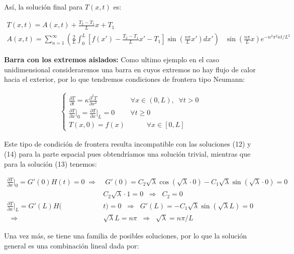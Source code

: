 \documentclass[12pt]{article}
\begin{document}
Así, la solución final para $T(x,t)$ es:

\begin{align}
    T(x,t) = A(x,t) + \frac{T_2-T_1}{L}x + T_1 \;\;\;\;\;\;\;& \\
    \nonumber A(x,t) = \sum_{n=1}^{\infty} \left(\frac{2}{L}\int_0^L \left[f(x')-\frac{T_2-T_1}{L}x' -T_1\right]\sin \left(\frac{n\pi}{L}x'\right)dx'\right)&\sin\left(\frac{n\pi}{L}x\right) e^{-n^2\pi^2\kappa t/L^2}
\end{align}

\textbf{Barra con los extremos aislados: }Como ultimo ejemplo en el caso unidimensional consideraremos una barra en cuyos extremos no hay flujo de calor hacia el exterior, por lo que tendremos condiciones de frontera tipo Neumann:

\begin{align}
    \begin{cases}
        \frac{\partial T}{\partial t} = \kappa \frac{\partial^2 T}{\partial x^2} \;\;\;\;\;\;\;\;\;\;\;\;\;\;\;\;\; \forall x\in (0,L), \;\; \forall t>0 \\
        \frac{\partial T}{\partial x} \Big|_0 = \frac{\partial T}{\partial x}\Big|_L = 0 \;\;\;\;\;\;\;\; \forall t \geq 0 \\
        T(x,0) = f(x) \;\;\;\;\;\;\;\;\;\;\; \forall x\in [0,L]
    \end{cases}
\end{align}

Este tipo de condición de frontera resulta incompatible con las soluciones (12) y (14) para la parte espacial pues obtendríamos una solución trivial, mientras que para la solución (13) tenemos:

\begin{align*}
    \frac{\partial T}{\partial x}\Big|_0 = G'(0)H(t) = 0 \; \Rightarrow& \; G'(0) = C_2\sqrt{\lambda}\cos(\sqrt{\lambda}\cdot 0) - C_1\sqrt{\lambda}\sin(\sqrt{\lambda}\cdot 0) = 0 \\
    &C_2\sqrt{\lambda}\cdot 1 = 0 \;\; \Rightarrow \;\; C_2 = 0 \\
    \frac{\partial T}{\partial x}\Big|_L = G'(L)H(&t) = 0 \;\; \Rightarrow \;\; G'(L) = - C_1\sqrt{\lambda}\sin(\sqrt{\lambda}L) = 0 \\
    \;\; \Rightarrow \;\; &\sqrt{\lambda}L = n\pi \;\; \Rightarrow \;\; \sqrt{\lambda} = n\pi/L
\end{align*}

Una vez más, se tiene una familia de posibles soluciones, por lo que la solución general es una combinación lineal dada por:
\end{document}
